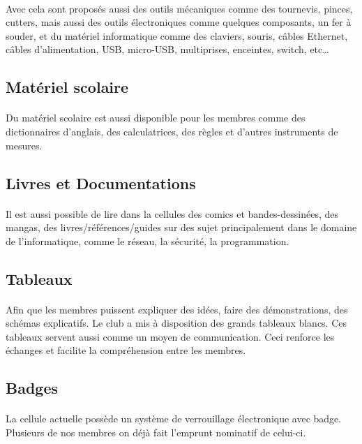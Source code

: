 \documentclass[11pt]{report}
\begin{document}
\paragraph{} Avec cela sont proposés aussi des outils mécaniques comme des
tournevis, pinces, cutters, mais aussi des outils électroniques comme quelques
composants, un fer à souder, et du matériel informatique comme des claviers,
souris, câbles Ethernet, câbles d'alimentation, USB, micro-USB, multiprises,
enceintes, switch, etc\ldots

\subsection{Matériel scolaire}

\paragraph{} Du matériel scolaire est aussi disponible pour les membres comme
des dictionnaires d'anglais, des calculatrices, des règles et d'autres
instruments de mesures.

\subsection{Livres et Documentations}

\paragraph{} Il est aussi possible de lire dans la cellules des comics et
bandes-dessinées, des mangas, des livres/références/guides sur des sujet
principalement dans le domaine de l'informatique, comme le réseau, la sécurité,
la programmation.

\subsection{Tableaux}

\paragraph{} Afin que les membres puissent expliquer des idées, faire des
démonstrations, des schémas explicatifs. Le club a mis à disposition des grands
tableaux blancs. Ces tableaux servent aussi comme un moyen de communication.
Ceci renforce les échanges et facilite la compréhension entre les membres.

\subsection{Badges}

\paragraph{} La cellule actuelle possède un système de verrouillage
électronique avec badge. Plusieurs de nos membres on déjà fait l'emprunt
nominatif de celui-ci.
\end{document}
